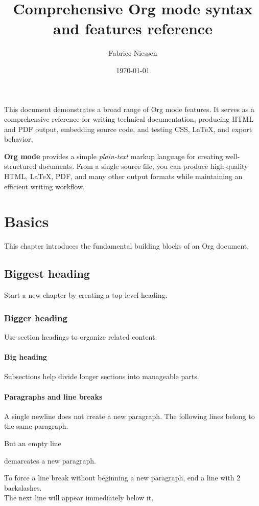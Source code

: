 \documentclass{mcreport}
\author{Fabrice Niessen}
\date{\today}
\title{Comprehensive Org mode syntax and features reference}
\begin{document}
\maketitle
\setcounter{tocdepth}{2}
\tableofcontents

This document demonstrates a broad range of Org mode features. It serves as
a comprehensive reference for writing technical documentation, producing HTML
and PDF output, embedding source code, and testing CSS, \LaTeX{}, and export
behavior.

\textbf{Org mode} provides a simple \emph{plain-text} markup language for creating
well-structured documents. From a single source file, you can produce
high-quality HTML, \LaTeX{}, PDF, and many other output formats while maintaining
an efficient writing workflow.
\chapter{Basics}
\label{sec:orgbaff123}

This chapter introduces the fundamental building blocks of an Org document.
\section{Biggest heading}
\label{sec:org3339894}

Start a new chapter by creating a top-level heading.
\subsection{Bigger heading}
\label{sec:org11da43b}

Use section headings to organize related content.
\subsubsection{Big heading}
\label{sec:orgad94917}

Subsections help divide longer sections into manageable parts.
\subsubsection{Paragraphs and line breaks}
\label{sec:org88476f2}

A single newline does not create a new paragraph.
The following lines belong to the same paragraph.

But an empty line

demarcates a new paragraph.

To force a line break without beginning a new paragraph, end a line with
2 backslashes. \\
The next line will appear immediately below it.
\end{document}
